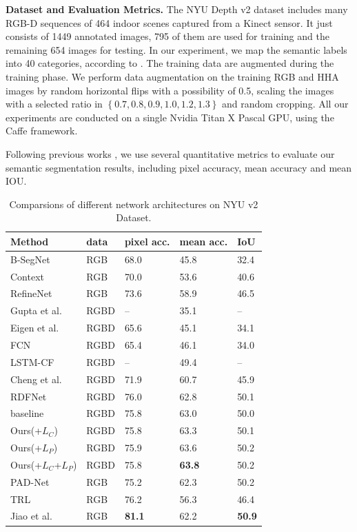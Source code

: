 {\bf{Dataset and Evaluation Metrics.}} 
The NYU Depth v2 dataset includes many RGB-D sequences of 464 indoor scenes captured from a Kinect sensor. 
%
It just consists of 1449 annotated images, 795 of them are used for training and the remaining 654 images for testing.
%
In our experiment, we map the semantic labels into 40 categories, according to \cite{Gupta2014}.
%
The training data are augmented during the training phase. 
%
We perform data augmentation on the training RGB and HHA images by random horizontal flips with a possibility of 0.5, scaling the images with a selected ratio in $\left\{0.7,0.8,0.9,1.0,1.2,1.3\right\}$ and random cropping. 
%
All our experiments are conducted on a single Nvidia Titan X Pascal GPU, using the Caffe framework.


Following previous works
\cite{Eigen2015,Gupta2014,Kendall2015,Lin2016,Lin2017,Li2016,Cheng2017,Park2017,Xu2018,Zhang2018,Jiao2018}, we use several quantitative metrics to evaluate our semantic segmentation results, including pixel 
accuracy, mean accuracy and mean IOU. 
%
\begin{table}[tb]
	\centering
	\caption{Comparsions of different network architectures on NYU v2 Dataset.}
	\begin{tabular*}{8.7cm}{lllll}
		\hline
		Method & data & pixel acc. & mean acc. & IoU\\
		\hline \hline
		B-SegNet \cite{Kendall2015} & RGB &68.0 & 45.8 & 32.4 \\
		Context \cite{Lin2016} & RGB & 70.0 & 53.6 & 40.6 \\
		RefineNet \cite{Lin2017} & RGB & 73.6 & 58.9 & 46.5\\
		\hline
		Gupta et al. \cite{Gupta2014} & RGBD & -- & 35.1 &--\\
		Eigen et al. \cite{Eigen2015} & RGBD & 65.6 & 45.1 & 34.1\\
		FCN \cite{Long2015} & RGBD & 65.4 & 46.1 & 34.0 \\
		LSTM-CF \cite{Li2016} & RGBD & --& 49.4 & -- \\
		Cheng et al.\cite{Cheng2017} & RGBD & 71.9 & 60.7 & 45.9 \\
		RDFNet \cite{Park2017} & RGBD & 76.0 & 62.8 & 50.1\\	
		\hline
		baseline &RGBD & 75.8 & 63.0 & 50.0\\
		Ours(+$L_C$) & RGBD & 75.8 & 63.3 & 50.1\\
		Ours(+$L_{P}$) & RGBD & 75.9 & 63.6 & 50.2\\
		Ours(+$L_{C}$+$L_{P}$)& RGBD & 75.8 & \bf{63.8} & 50.2\\
		\hline
		PAD-Net \cite{Xu2018} & RGB &75.2 & 62.3 & 50.2\\
		TRL \cite{Zhang2018} & RGB &76.2 & 56.3 & 46.4\\
		Jiao et al.\cite{Jiao2018} & RGB & \bf{81.1} & 62.2 & \bf{50.9}\\
		\hline		 		
	\end{tabular*}
	\label{Tab:Results}
\end{table}
